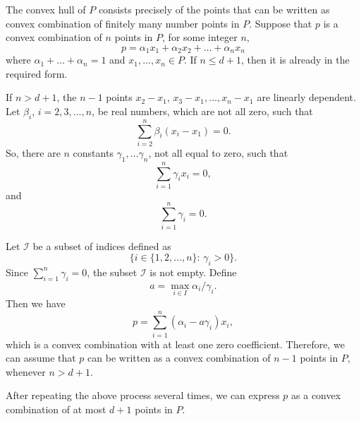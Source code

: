 \documentclass[12pt]{article}
\begin{document}
The convex hull of $P$ consists precisely of the points that can be written as convex combination of finitely many number points in $P$. Suppose that $p$ is a convex combination of $n$ points in $P$, for some integer $n$,
\[
p = \alpha_1x_1 + \alpha_2 x_2 + \ldots + \alpha_n x_n
\]
where $\alpha_1+\ldots +\alpha_n = 1$ and $x_1, \ldots, x_n \in P$. If $n \leq d+1$, then it is already in the required form.

If $n > d+1$, the $n-1$ points $x_2-x_1$, $x_3-x_1, \ldots, x_n-x_1$ are linearly dependent. Let $\beta_i$, $i=2,3,\ldots, n$, be real numbers, which are not all zero, such that
\[
 \sum_{i=2}^n \beta_i (x_i-x_1) = 0.
\]
So, there are $n$ constants $\gamma_1, \ldots \gamma_n$, not all equal to zero, such that \[\sum_{i=1}^n \gamma_i x_i = 0,\]
and
\[
 \sum_{i=1}^n \gamma_i = 0.
\]

Let $\mathcal{I}$ be a subset of indices defined as
\[\{i\in\{1,2,\ldots, n\}:\, \gamma_i > 0\}.
\]
Since $ \sum_{i=1}^n \gamma_i = 0$, the subset $\mathcal{I}$ is not empty. Define
\[
 a = \max_{i\in I} \alpha_i/\gamma_i.
\]
Then we have
\[
 p = \sum_{i=1}^n (\alpha_i - a\gamma_i) x_i, 
\]
which is a convex combination with at least one zero coefficient. Therefore, we can assume that $p$ can be written as a convex combination of $n-1$ points in $P$, whenever $n > d+1$.

After repeating the above process several times, we can express $p$ as a convex combination of at most $d+1$ points in $P$.
\end{document}
